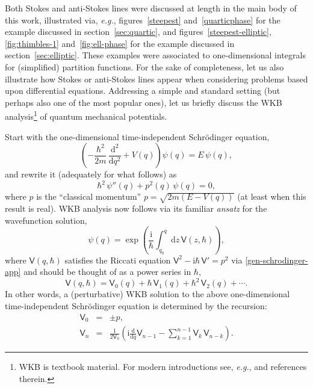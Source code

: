 \documentclass[11pt,a4paper]{article}
\newcommand{\be}{\begin{equation}}
\newcommand{\ee}{\end{equation}}
\newcommand{\bea}{\begin{eqnarray}}
\newcommand{\eea}{\end{eqnarray}}
\newcommand{\rmi}{{\mathrm{i}}}
\newcommand{\rmd}{{\mathrm{d}}}
\begin{document}
Both Stokes and anti-Stokes lines were discussed at length in the main body of this work, illustrated via, \textit{e.g.}, figures~\ref{steepest} and~\ref{quarticphase} for the example discussed in section~\ref{sec:quartic}, and figures~\ref{steepest-elliptic}, \ref{fig:thimbles-1} and~\ref{fig:ell-phase} for the example discussed in section~\ref{sec:elliptic}. These examples were associated to one-dimensional integrals for (simplified) partition functions. For the sake of completeness, let us also illustrate how Stokes or anti-Stokes lines appear when considering problems based upon differential equations. Addressing a simple and standard setting (but perhaps also one of the most popular ones), let us briefly discuss the WKB analysis\footnote{WKB is textbook material. For modern introductions see, \textit{e.g.}, \cite{kt05, kp09} and references therein.} of quantum mechanical potentials.

Start with the one-dimensional time-independent Schr\"odinger equation,
%
\be
\left( - \frac{\hbar^2}{2m}\, \frac{\rmd^2}{\rmd q^2} + V(q) \right) \psi(q) = E\, \psi (q),
\ee
%
\noindent
and rewrite it (adequately for what follows) as
%
\be
\label{gen-schrodinger-app}
\hbar^2\, \psi''(q) + p^2(q)\, \psi(q) = 0,
\ee
%
\noindent
where $p$ is the ``classical momentum'' $p = \sqrt{2m \left( E - V(q) \right)}$ (at least when this result is real). WKB analysis now follows via its familiar \textit{ansatz} for the wavefunction solution,
%
\be
\label{WKB-app}
\psi(q) = \exp \left( \frac{\rmi}{\hbar} \int_{q_0}^q \rmd z\, \mathsf{V} (z,\hbar) \right),
\ee
%
\noindent
where $\mathsf{V} (q,\hbar)$ satisfies the Riccati equation $\mathsf{V}^2 - \rmi\hbar\, \mathsf{V}' = p^2$ via \eqref{gen-schrodinger-app} and should be thought of as a power series in $\hbar$,
%
\be
\label{V-exp-app}
\mathsf{V} (q,\hbar) = \mathsf{V}_0 (q) + \hbar\, \mathsf{V}_1 (q) + \hbar^2\, \mathsf{V}_2 (q) + \cdots.
\ee
%
\noindent
In other words, a (perturbative) WKB solution to the above one-dimensional time-independent Schr\"odinger equation is determined by the recursion:
%
\bea
\label{pmp-app}
\mathsf{V}_0 &=& \pm p, \\
\mathsf{V}_n &=& \frac{1}{2 \mathsf{V}_0} \left( \rmi \frac{\rmd}{\rmd q} \mathsf{V}_{n-1} - \sum_{k=1}^{n-1} \mathsf{V}_{k}\, \mathsf{V}_{n-k} \right).
\eea
\end{document}
